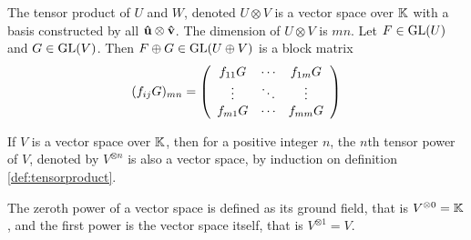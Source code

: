 	\begin{definition}\label{def:tensorproduct}
		The tensor product of $U$ and $W$, denoted $U \otimes V$ is a vector space over $\mathbb{K}$ with a basis constructed by all $\mathbf{\hat{u}} \otimes \mathbf{\hat{v}}$. The dimension of $U \otimes V$ is $mn$. Let $F \in \text{GL}(U)$ and $G \in \text{GL}(V)$. Then $F \oplus G \in \text{GL}(U \oplus V)$ is a block matrix
		\begin{align}
			(f_{ij}G)_{mn}=
			\left(
			\begin{array}{c c c}
				f_{11}G & \cdots & f_{1m}G \\
				\vdots & \ddots & \vdots \\
				f_{m1}G & \cdots & f_{mm}G
			\end{array}
			\right)			
		\end{align}
	\end{definition}
		
	\begin{definition}
		If $V$ is a vector space over $\mathbb{K}$, then for a positive integer $n$, the $n$th tensor power of $V$, denoted by $V^{\otimes n}$ is also a vector space, by induction on definition \ref{def:tensorproduct}.
		\begin{notation}
			The zeroth power of a vector space is defined as its ground field, that is $V^{\otimes 0} = \mathbb{K}$, and the first power is the vector space itself, that is $V^{\otimes 1} = V$.
		\end{notation}
	\end{definition}
	